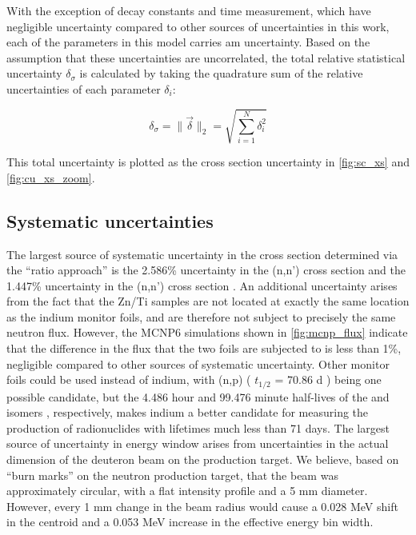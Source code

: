 \documentclass[5p]{elsarticle}
\newcommand{\norm}[1]{\lVert #1 \rVert}
\begin{document}
With the exception of decay constants  and time measurement, which have negligible uncertainty compared to other sources of uncertainties in this work, each of the parameters in this model carries am uncertainty.
Based on the assumption that these uncertainties are uncorrelated, the total relative statistical uncertainty $\delta_\sigma$ is calculated by taking the quadrature sum of the relative uncertainties of each parameter  $\delta_i$:

\begin{equation}
\delta_\sigma = \norm{ \ensuremath{\vec{\delta}} }_2 = \sqrt{\sum_{i=1}^N  \delta_i^2  }
\end{equation}

This total  uncertainty is plotted as the cross section uncertainty in \autoref{fig:sc_xs} and \autoref{fig:cu_xs_zoom}.



\subsection{Systematic uncertainties}

The largest source of systematic uncertainty in the cross section determined via the \enquote{ratio approach} is the 2.586\% uncertainty in the (n,n')  cross section and the 1.447\% uncertainty in the (n,n')  cross section  \cite{Capote2012,zsolnay2012technical}.
 An additional uncertainty arises from the fact that the Zn/Ti samples are not located at exactly the same location as the indium monitor foils, and are therefore not subject to precisely the same neutron flux.
 However, the MCNP6 simulations shown in \autoref{fig:mcnp_flux} indicate that the difference in the flux that the two foils are subjected to is less than 1\%, negligible compared to other sources of systematic uncertainty.
 Other monitor foils could be used instead of indium, with (n,p) ( $t_{1/2}$ = 70.86 d \cite{Nesaraja2010}) being one possible candidate, but the 4.486 hour and 99.476 minute half-lives of the  and  isomers \cite{Blachot2012,Blachot2010a}, respectively, makes indium a better candidate for measuring the production of radionuclides with lifetimes much less than 71 days.
The largest source of uncertainty in energy window arises from uncertainties in the actual dimension of the deuteron beam on the production target.
 We believe, based on \enquote{burn marks} on the neutron production target, that the beam was approximately circular, with a flat intensity profile and a 5 mm diameter.
 However, every 1 mm change in the beam radius would cause a 0.028 MeV shift in the centroid and a 0.053 MeV increase in the effective energy bin width.
 
\end{document}

